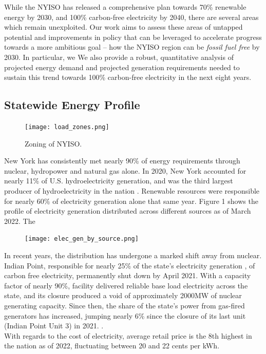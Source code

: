 \documentclass[plain]{article}
\newcommand{\1}{\mathbbm{1}}
\begin{document}
While the NYISO has released a comprehensive plan towards 70\% renewable energy by 2030, and 100\% carbon-free electricity by 2040, 
there are several areas which remain unexploited. Our work aims to assess these areas of untapped potential and improvements in policy that can be leveraged to accelerate progress towards a more ambitious goal -- how the NYISO region can be \textit{fossil fuel free} by 2030. In particular, we  We also provide a robust, quantitative analysis of projected energy demand and projected generation requirements needed to sustain this trend towards 100\% carbon-free electricity in the next eight years.

\subsection{Statewide Energy Profile}
\begin{figure}[H]
	\centering
	\texttt{[image: load\_zones.png]}
	\caption{Zoning of NYISO.}
	\label{fig:}
\end{figure}

New York has consistently met nearly 90\% of energy requirements through nuclear, hydropower and natural gas alone. In 2020, New York accounted for nearly 11\% of U.S. hydroelectricity generation, and was the third largest producer of hydroelectricity in the nation \cite{nyserda_story_nodate}. Renewable resources were responsible for nearly 60\% of electricity generation alone that same year. Figure 1 shows the profile of electricity generation distributed across different sources as of March 2022. The 

\begin{figure}[H]
	\centering
	\texttt{[image: elec\_gen\_by\_source.png]}
	\caption{}
	\label{fig:}
\end{figure}
In recent years, the distribution has undergone a marked shift away from nuclear. Indian Point, responsible for nearly 25\% of the state's electricity generation \cite{mcgeehan_indian_2021}, of carbon free electricity, permanently shut down by April 2021. With a capacity factor of nearly 90\%, facility delivered reliable base load electricity across the state, and its closure produced a void of approximately 2000MW of nuclear generating capacity. Since then, the share of the state's power from gas-fired generators has increased, jumping nearly 6\% since the closure of its last unit (Indian Point Unit 3) in 2021. .
\\
With regards to the cost of electricity, average retail price is the 8th highest in the nation as of 2022, fluctuating between 20 and 22 cents per kWh.
\end{document}
